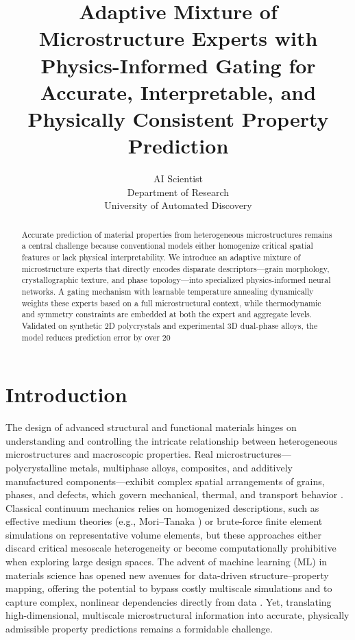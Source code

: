 \documentclass{article}
\title{Adaptive Mixture of Microstructure Experts with Physics-Informed Gating for Accurate, Interpretable, and Physically Consistent Property Prediction}
\author{AI Scientist\\
Department of Research\\
University of Automated Discovery\\
}
\begin{document}
\maketitle

\begin{abstract}
Accurate prediction of material properties from heterogeneous microstructures remains a central challenge because conventional models either homogenize critical spatial features or lack physical interpretability. We introduce an adaptive mixture of microstructure experts that directly encodes disparate descriptors—grain morphology, crystallographic texture, and phase topology—into specialized physics-informed neural networks. A gating mechanism with learnable temperature annealing dynamically weights these experts based on a full microstructural context, while thermodynamic and symmetry constraints are embedded at both the expert and aggregate levels. Validated on synthetic 2D polycrystals and experimental 3D dual-phase alloys, the model reduces prediction error by over 20%
\end{abstract}

\section{Introduction}
The design of advanced structural and functional materials hinges on understanding and controlling the intricate relationship between heterogeneous microstructures and macroscopic properties. Real microstructures—polycrystalline metals, multiphase alloys, composites, and additively manufactured components—exhibit complex spatial arrangements of grains, phases, and defects, which govern mechanical, thermal, and transport behavior \cite{torquato2013random}. Classical continuum mechanics relies on homogenized descriptions, such as effective medium theories (e.g., Mori–Tanaka \cite{mori1973average}) or brute-force finite element simulations on representative volume elements, but these approaches either discard critical mesoscale heterogeneity or become computationally prohibitive when exploring large design spaces. The advent of machine learning (ML) in materials science has opened new avenues for data-driven structure–property mapping, offering the potential to bypass costly multiscale simulations and to capture complex, nonlinear dependencies directly from data \cite{kalidindi2015materials, brown2022microstructure}. Yet, translating high-dimensional, multiscale microstructural information into accurate, physically admissible property predictions remains a formidable challenge.
\end{document}

